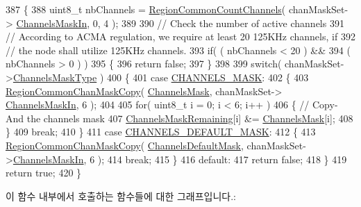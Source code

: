 \begin{DoxyCode}
387 \{
388     uint8\_t nbChannels = \mbox{\hyperlink{group___r_e_g_i_o_n_c_o_m_m_o_n_gac23f0831812f610f57f42f6cf87368c9}{RegionCommonCountChannels}}( chanMaskSet->
      \mbox{\hyperlink{structs_chan_mask_set_params_ade387d6ecaf27781b14ad97ebdfc0695}{ChannelsMaskIn}}, 0, 4 );
389 
390     \textcolor{comment}{// Check the number of active channels}
391     \textcolor{comment}{// According to ACMA regulation, we require at least 20 125KHz channels, if}
392     \textcolor{comment}{// the node shall utilize 125KHz channels.}
393     \textcolor{keywordflow}{if}( ( nbChannels < 20 ) &&
394         ( nbChannels > 0 ) )
395     \{
396         \textcolor{keywordflow}{return} \textcolor{keyword}{false};
397     \}
398 
399     \textcolor{keywordflow}{switch}( chanMaskSet->\mbox{\hyperlink{structs_chan_mask_set_params_a02b75be74cbc34fa2126b2c250ea9283}{ChannelsMaskType}} )
400     \{
401         \textcolor{keywordflow}{case} \mbox{\hyperlink{group___r_e_g_i_o_n_gga7a62e669f567fc160ad58210664bca9ca1e68275c0b16a0c4935eada4315dd089}{CHANNELS\_MASK}}:
402         \{
403             \mbox{\hyperlink{group___r_e_g_i_o_n_c_o_m_m_o_n_ga95f5199d490113269fae7f2e0569e9a0}{RegionCommonChanMaskCopy}}( \mbox{\hyperlink{_region_a_u915_8c_a2188957b5ca6af8092154d7ccbfa5757}{ChannelsMask}}, chanMaskSet->
      \mbox{\hyperlink{structs_chan_mask_set_params_ade387d6ecaf27781b14ad97ebdfc0695}{ChannelsMaskIn}}, 6 );
404 
405             \textcolor{keywordflow}{for}( uint8\_t i = 0; i < 6; i++ )
406             \{ \textcolor{comment}{// Copy-And the channels mask}
407                 \mbox{\hyperlink{_region_a_u915_8c_a567333cec639a004655cc1717e9d0928}{ChannelsMaskRemaining}}[i] &= \mbox{\hyperlink{_region_a_u915_8c_a2188957b5ca6af8092154d7ccbfa5757}{ChannelsMask}}[i];
408             \}
409             \textcolor{keywordflow}{break};
410         \}
411         \textcolor{keywordflow}{case} \mbox{\hyperlink{group___r_e_g_i_o_n_gga7a62e669f567fc160ad58210664bca9ca9bbb18c8600ad8781ba04a2cb121ea60}{CHANNELS\_DEFAULT\_MASK}}:
412         \{
413             \mbox{\hyperlink{group___r_e_g_i_o_n_c_o_m_m_o_n_ga95f5199d490113269fae7f2e0569e9a0}{RegionCommonChanMaskCopy}}( 
      \mbox{\hyperlink{_region_a_u915_8c_ac127b19779301713d5ed92eb03366a2d}{ChannelsDefaultMask}}, chanMaskSet->\mbox{\hyperlink{structs_chan_mask_set_params_ade387d6ecaf27781b14ad97ebdfc0695}{ChannelsMaskIn}}, 6 );
414             \textcolor{keywordflow}{break};
415         \}
416         \textcolor{keywordflow}{default}:
417             \textcolor{keywordflow}{return} \textcolor{keyword}{false};
418     \}
419     \textcolor{keywordflow}{return} \textcolor{keyword}{true};
420 \}
\end{DoxyCode}
이 함수 내부에서 호출하는 함수들에 대한 그래프입니다.\+:
\mbox{\label{group___r_e_g_i_o_n_a_u915_ga1065da4a50172d3af558c7bacc28ad10}} 
